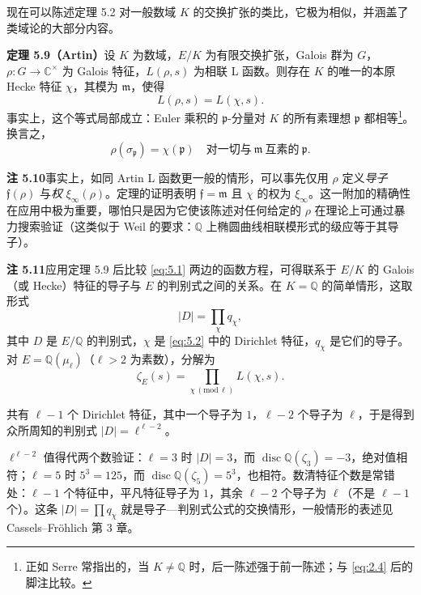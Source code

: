 现在可以陈述定理 5.2 对一般数域 $K$ 的交换扩张的类比，它极为相似，并涵盖了类域论的大部分内容。

\par\medskip\noindent\textbf{定理 5.9（Artin）}\quad 设 $K$ 为数域，$E/K$ 为有限交换扩张，Galois 群为 $G$，$\rho\colon G\to\mathbb{C}^{\times}$ 为 Galois 特征，$L(\rho,s)$ 为相联 L 函数。则存在 $K$ 的唯一的本原 Hecke 特征 $\chi$，其模为 $\mathfrak{m}$，使得
\[
L(\rho,s)=L(\chi,s).
\]
事实上，这个等式局部成立：Euler 乘积的 $\mathfrak{p}$-分量对 $K$ 的所有素理想 $\mathfrak{p}$ 都相等\footnote{正如 Serre 常指出的，当 $K\neq\mathbb{Q}$ 时，后一陈述强于前一陈述；与 \eqref{eq:2.4} 后的脚注比较。}。换言之，
\[
\rho(\sigma_{\mathfrak{p}})=\chi(\mathfrak{p})
\quad\text{对一切与}\ \mathfrak{m}\ \text{互素的}\ \mathfrak{p}.
\]

\par\medskip\noindent\textbf{注 5.10}\quad 事实上，如同 Artin L 函数更一般的情形，可以事先仅用 $\rho$ 定义\emph{导子} $\mathfrak{f}(\rho)$ 与\emph{权} $\xi_{\infty}(\rho)$。定理的证明表明 $\mathfrak{f}=\mathfrak{m}$ 且 $\chi$ 的权为 $\xi_{\infty}$。这一附加的精确性在应用中极为重要，哪怕只是因为它使该陈述对任何给定的 $\rho$ 在理论上可通过暴力搜索验证（这类似于 Weil 的要求：$\mathbb{Q}$ 上椭圆曲线相联模形式的级应等于其导子）。

\par\medskip\noindent\textbf{注 5.11}\quad 应用定理 5.9 后比较 \eqref{eq:5.1} 两边的函数方程，可得联系于 $E/K$ 的 Galois（或 Hecke）特征的导子与 $E$ 的判别式之间的关系。在 $K=\mathbb{Q}$ 的简单情形，这取形式
\[
|D|=\prod_{\chi}q_{\chi},
\]
其中 $D$ 是 $E/\mathbb{Q}$ 的判别式，$\chi$ 是 \eqref{eq:5.2} 中的 Dirichlet 特征，$q_{\chi}$ 是它们的导子。对 $E=\mathbb{Q}(\mu_{\ell})$（$\ell>2$ 为素数），分解为
\[
\zeta_E(s)=\prod_{\chi\,(\mathrm{mod}\,\ell)}L(\chi,s).
\]

共有 $\ell-1$ 个 Dirichlet 特征，其中一个导子为 $1$，$\ell-2$ 个导子为 $\ell$，于是得到众所周知的判别式 $|D|=\ell^{\ell-2}$。

\begin{annote}
$\ell^{\ell-2}$ 值得代两个数验证：$\ell=3$ 时 $|D|=3$，而 $\operatorname{disc}\mathbb{Q}(\zeta_3)=-3$，绝对值相符；$\ell=5$ 时 $5^{3}=125$，而 $\operatorname{disc}\mathbb{Q}(\zeta_5)=5^{3}$，也相符。数清特征个数是常错处：$\ell-1$ 个特征中，平凡特征导子为 $1$，其余 $\ell-2$ 个导子为 $\ell$（不是 $\ell-1$ 个）。这条 $|D|=\prod q_{\chi}$ 就是导子—判别式公式的交换情形，一般情形的表述见 Cassels--Fröhlich 第 3 章。
\par\vspace{0.15em}{\raggedleft 【来源：Cassels--Fröhlich《Algebraic Number Theory》Ch.~3（A）；Hasse《Vorlesungen über Klassenkörpertheorie》（A）】\par}
\end{annote}

